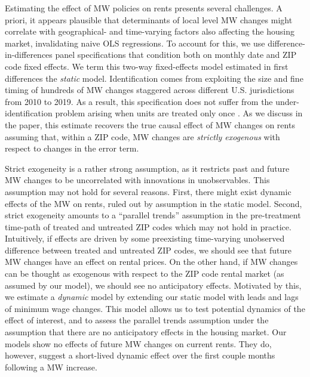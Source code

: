 Estimating the effect of MW policies on rents presents several challenges. A priori, it appears 
plausible that determinants of local level MW changes might correlate with geographical- and 
time-varying factors also affecting the housing market, invalidating naive OLS regressions. To 
account for this, we use difference-in-differences panel specifications that condition both on 
monthly date and ZIP code fixed effects. We term this two-way fixed-effects model estimated in 
first differences the \textit{static} model. Identification comes from exploiting the size and 
fine timing of hundreds of MW changes staggered across different U.S. jurisdictions from 2010 
to 2019. As a result, this specification does not suffer from the under-identification problem 
arising when units are treated only once \parencite{BorusyakJaravel2017}. As we discuss in the 
paper, this estimate recovers the true causal effect of MW changes on rents assuming that, within 
a ZIP code, MW changes are \textit{strictly exogenous} with respect to changes in the error term. 

Strict exogeneity is a rather strong assumption, as it restricts past and future MW changes to 
be uncorrelated with innovations in unobservables. This assumption may not hold for several 
reasons. First, there might exist dynamic effects of the MW on rents, ruled out by assumption 
in the static model. Second, strict exogeneity amounts to a ``parallel trends'' assumption in 
the pre-treatment time-path of treated and untreated ZIP codes which may not hold in practice. Intuitively, if effects are driven by some preexisting time-varying unobserved difference 
between treated and untreated ZIP codes, we should see that future MW changes have an effect on 
rental prices. On the other hand, if MW changes can be thought as exogenous with respect to the 
ZIP code rental market (as assumed by our model), we should see no anticipatory effects. 
Motivated by this, we estimate a \textit{dynamic} model by extending our static model with leads 
and lags of minimum wage changes. This model allows us to test potential dynamics of the effect 
of interest, and to assess the parallel trends assumption under the assumption that there are 
no anticipatory effects in the housing market. Our models show no effects of future MW changes 
on current rents. They do, however, suggest a short-lived dynamic effect over the first couple 
months following a MW increase.

